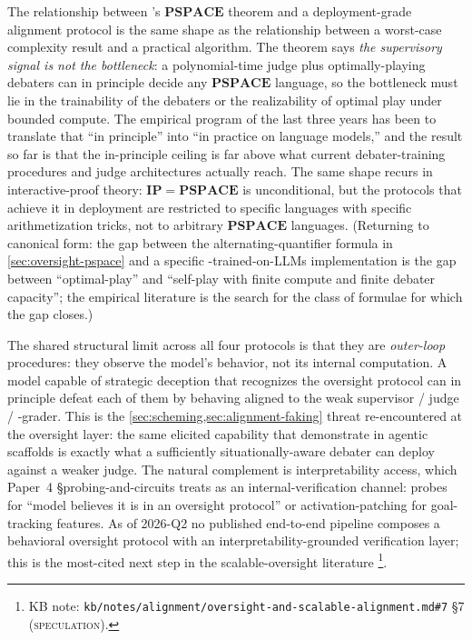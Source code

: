 \begin{intuition}
The relationship between 's $\mathbf{PSPACE}$ theorem and a
deployment-grade alignment protocol is the same shape as the
relationship between a worst-case complexity result and a practical
algorithm. The theorem says \emph{the supervisory signal is not the
bottleneck}: a polynomial-time judge plus optimally-playing debaters
can in principle decide any $\mathbf{PSPACE}$ language, so the
bottleneck must lie in the trainability of the debaters or the
realizability of optimal play under bounded compute. The empirical
program of the last three years has been to translate that ``in
principle'' into ``in practice on language models,'' and the result
so far is that the in-principle ceiling is far above what current
debater-training procedures and judge architectures actually reach.
The same shape recurs in interactive-proof theory: $\mathbf{IP} =
\mathbf{PSPACE}$ is unconditional, but the protocols that achieve it
in deployment are restricted to specific languages with specific
arithmetization tricks, not to arbitrary $\mathbf{PSPACE}$ languages.
(Returning to canonical form: the gap between the alternating-quantifier
formula in \cref{sec:oversight-pspace} and a specific
-trained-on-LLMs implementation is the gap between
``optimal-play'' and ``self-play with finite compute and finite
debater capacity''; the empirical literature is the search for the
class of formulae for which the gap closes.)
\end{intuition}

The shared structural limit across all four protocols is that they
are \emph{outer-loop} procedures: they observe the model's behavior,
not its internal computation. A model capable of strategic deception
that recognizes the oversight protocol can in principle defeat each
of them by behaving aligned to the weak supervisor /  judge /
-grader. This is the
\cref{sec:scheming,sec:alignment-faking} threat re-encountered at the
oversight layer: the same elicited capability that
\citet{meinke2024-apollo-scheming} demonstrate in agentic scaffolds
is exactly what a sufficiently situationally-aware debater can deploy
against a weaker judge. The natural complement is interpretability
access, which Paper~4 \S{}probing-and-circuits treats as an
internal-verification channel: probes for ``model believes it is in
an oversight protocol'' or activation-patching for goal-tracking
features. As of 2026-Q2 no published end-to-end pipeline composes a
behavioral oversight protocol with an interpretability-grounded
verification layer; this is the most-cited next step in the
scalable-oversight literature%
\footnote{KB note: \texttt{kb/notes/alignment/oversight-and-scalable-alignment.md\#7}
\S 7 (\textsc{speculation}).}.

